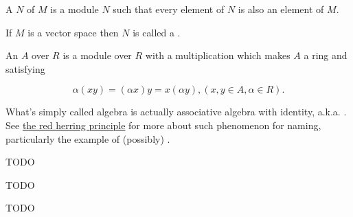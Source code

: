 \begin{definition}[Submodule]
    \label{Submodule}
    \leanok

    A  $N$ of $M$ is a module $N$ such that every element of $N$ is also an element of $M$.

\end{definition}

\begin{remark}
    \label{mk:Submodule}

    If $M$ is a vector space then $N$ is called a .
    
\end{remark}

\begin{definition}[Algebra]
    \label{Algebra}
    \leanok

    An  $A$ over $R$ is a module over $R$ with a multiplication which makes $A$ a ring and satisfying

    $$
    \alpha(x y)=(\alpha x) y=x(\alpha y),(x, y \in A, \alpha \in R) .
    $$

\end{definition}

\begin{remark}
    \label{mk:Algebra}

    What's simply called algebra is actually associative algebra with identity, a.k.a. . See
    \href{https://ncatlab.org/nlab/show/red%20herring%20principle}{the red herring principle}
    for more about such phenomenon for naming, particularly the example of (possibly) .
    
\end{remark}

\begin{definition}[RingHom]
    \label{RingHom}

    TODO

\end{definition}

\begin{definition}[FreeAlgebra]
    \label{FreeAlgebra}

    TODO

\end{definition}

\begin{definition}[LinearMap]
    \label{LinearMap}

    TODO

\end{definition}


